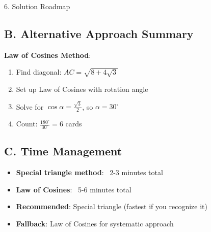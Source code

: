 \documentclass[12pt]{article}
\begin{document}
\begin{roadmapbox}{6. Solution Roadmap}
\subsection*{B. Alternative Approach Summary}

\textbf{Law of Cosines Method}:
\begin{enumerate}
    \item Find diagonal: $AC = \sqrt{8+4\sqrt{3}}$
    \item Set up Law of Cosines with rotation angle
    \item Solve for $\cos\alpha = \frac{\sqrt{3}}{2}$, so $\alpha = 30^\circ$
    \item Count: $\frac{180^\circ}{30^\circ} = 6$ cards
\end{enumerate}

\subsection*{C. Time Management}
\begin{itemize}[leftmargin=*]
    \item \textbf{Special triangle method}: ~2-3 minutes total
    \item \textbf{Law of Cosines}: ~5-6 minutes total
    \item \textbf{Recommended}: Special triangle (fastest if you recognize it)
    \item \textbf{Fallback}: Law of Cosines for systematic approach
\end{itemize}

\end{roadmapbox}
\end{document}
